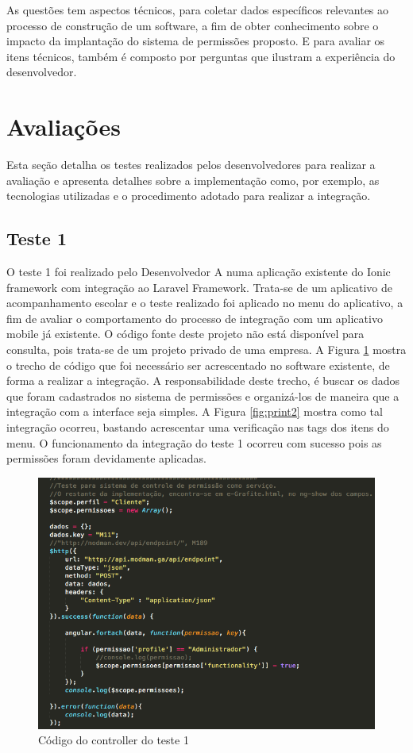 As questões tem aspectos técnicos, para coletar dados específicos relevantes ao processo de construção de um software, a fim de obter conhecimento sobre o impacto da implantação do sistema de permissões proposto. E para avaliar os itens técnicos, também é composto por perguntas que ilustram a experiência do desenvolvedor.


\section{Avaliações}\label{avaliacoes}

Esta seção detalha os testes realizados pelos desenvolvedores para realizar a avaliação e apresenta detalhes sobre a implementação como, por exemplo, as tecnologias utilizadas e o procedimento adotado para realizar a integração.

\subsection{Teste 1}

O teste 1 foi realizado pelo Desenvolvedor A numa aplicação existente do Ionic framework com integração ao Laravel Framework. Trata-se de um aplicativo de acompanhamento escolar e o teste realizado foi aplicado no menu do aplicativo, a fim de avaliar o comportamento do processo de integração com um aplicativo mobile já existente. O código fonte deste projeto não está disponível para consulta, pois trata-se de um projeto privado de uma empresa.
A Figura \ref{fig:print1} mostra o trecho de código que foi necessário ser acrescentado no software existente, de forma a realizar a integração. A responsabilidade deste trecho, é buscar os dados que foram cadastrados no sistema de permissões e organizá-los de maneira que a integração com a interface seja simples. A Figura \ref{fig:print2} mostra como tal integração ocorreu, bastando acrescentar uma verificação nas tags dos itens do menu. O funcionamento da integração do teste 1 ocorreu com sucesso pois as permissões foram devidamente aplicadas.

\begin{figure}
	\includegraphics[width=1\textwidth]{images/edic_a_o_do_controller-_teste_do_app_do_e-grafite}
	\caption{Código do controller do teste 1}
    \label{fig:print1}
\end{figure}

